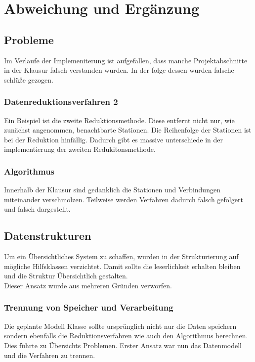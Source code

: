 \chapter{Abweichung und Ergänzung}\label{ch:abweichung-und-ergaenzung}

\section{Probleme}
Im Verlaufe der Implemeniterung ist aufgefallen, dass manche Projektabschnitte in der Klausur falsch verstanden wurden. In der folge dessen wurden falsche schlüße gezogen.\\

\subsection{Datenreduktionsverfahren 2}
Ein Beispiel ist die zweite Reduktionsmethode. Diese entfernt nicht nur, wie zunächst angenommen, benachtbarte Stationen. Die Reihenfolge der Stationen ist bei der Reduktion hinfällig. Dadurch gibt es massive unterschiede in der implementierung der zweiten Redukitonsmethode.\\

\subsection{Algorithmus}
Innerhalb der Klausur sind gedanklich die Stationen und Verbindungen miteinander verschmolzen. Teilweise werden Verfahren dadurch falsch gefolgert und falsch dargestellt.


\section{Datenstrukturen}
Um ein Übersichtliches System zu schaffen, wurden in der Strukturierung auf mögliche Hilfsklassen verzichtet. Damit sollte die leserlichkeit erhalten bleiben und die Struktur Übersichtlich gestalten.\\
Dieser Ansatz wurde aus mehreren Gründen verworfen.\\
\subsection{Trennung von Speicher und Verarbeitung}
Die geplante Modell Klasse sollte ursprünglich nicht nur die Daten speichern sondern ebenfalls die Reduktionsverfahren wie auch den Algorithmus berechnen. Dies führte zu Übersichts Problemen. Erster Ansatz war nun das Datenmodell und die Verfahren zu trennen.\\ 

